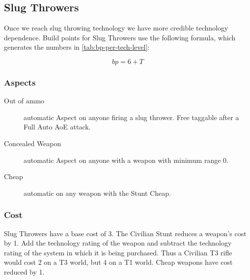 \subsection{Slug Throwers}
\label{sec:slug-throwers}

Once we reach slug throwing technology we have more credible
technology dependence. Build points for Slug Throwers use the following formula, which generates the numbers in \autoref{tab:bp-per-tech-level}:

\[ bp = 6 + T \]





\subsubsection{Aspects}
\begin{description}
\item[Out of ammo]
automatic Aspect on anyone firing a slug thrower. Free
taggable after a Full Auto AoE attack.
\item[Concealed Weapon]
automatic Aspect on anyone with a weapon with minimum range 0.
\item[Cheap]
automatic on any weapon with the Stunt Cheap.
\end{description}

\subsubsection{Cost}

Slug Throwers have a base cost of 3. The Civilian Stunt reduces a
weapon's cost by 1. Add the technology rating of the weapon and
subtract the technology rating of the system in which it is being
purchased. Thus a Civilian T3 rifle would cost 2 on a T3 world, but 4
on a T1 world. Cheap weapons have cost reduced by 1.

